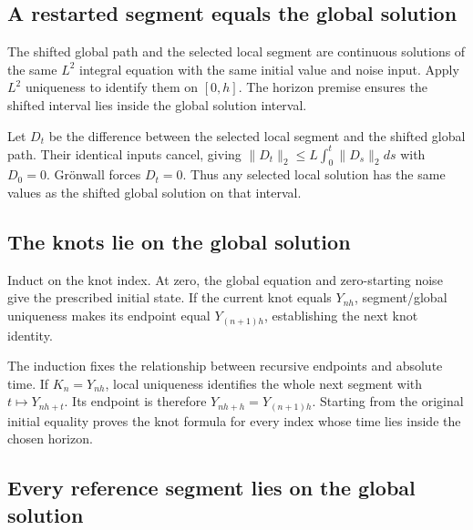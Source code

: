 \documentclass[11pt,a4paper]{report}
\begin{document}
\subsection{\texorpdfstring{A restarted segment equals the global solution}{A restarted segment equals the global solution}}
\label{report-step-UnadjustedLangevin-BrownianSegmentsGlobal-lean-3}


The shifted global path and the selected local segment are continuous solutions of the same \(L^2\) integral equation with the same initial value and noise input. Apply \(L^2\) uniqueness to identify them on \([0,h]\). The horizon premise ensures the shifted interval lies inside the global solution interval.



Let \(D_t\) be the difference between the selected local segment and the shifted global path. Their identical inputs cancel, giving \(\|D_t\|_2\le L\int_0^t\|D_s\|_2ds\) with \(D_0=0\). Grönwall forces \(D_t=0\). Thus any selected local solution has the same values as the shifted global solution on that interval.

\subsection{\texorpdfstring{The knots lie on the global solution}{The knots lie on the global solution}}
\label{report-step-UnadjustedLangevin-BrownianSegmentsGlobal-lean-4}


Induct on the knot index. At zero, the global equation and zero-starting noise give the prescribed initial state. If the current knot equals \(Y_{nh}\), segment/\allowbreak{}global uniqueness makes its endpoint equal \(Y_{(n+1)h}\), establishing the next knot identity.



The induction fixes the relationship between recursive endpoints and absolute time. If \(K_n=Y_{nh}\), local uniqueness identifies the whole next segment with \(t\mapsto Y_{nh+t}\). Its endpoint is therefore \(Y_{nh+h}=Y_{(n+1)h}\). Starting from the original initial equality proves the knot formula for every index whose time lies inside the chosen horizon.

\subsection{\texorpdfstring{Every reference segment lies on the global solution}{Every reference segment lies on the global solution}}
\label{report-step-UnadjustedLangevin-BrownianSegmentsGlobal-lean-5}
\end{document}
